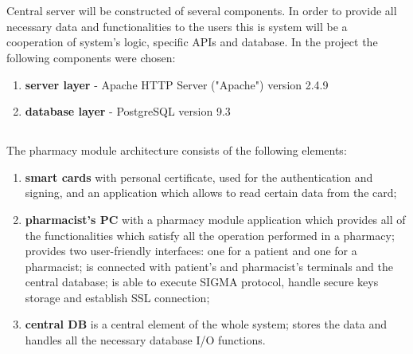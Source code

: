 \section{}

\subsection{}

Central server will be constructed of several components. In order to provide all necessary data and functionalities to the users this is system will be a cooperation of system's logic, specific APIs and database. In the project the following components were chosen:
\begin{enumerate}
\item \textbf{server layer} - Apache HTTP Server ("Apache") version 2.4.9
\item \textbf{database layer} - PostgreSQL version 9.3
\end{enumerate}

\subsection{}

The pharmacy module architecture consists of the following elements:
\begin{enumerate}
\item \textbf{smart cards} with personal certificate, used for the authentication and signing, and an application which allows to read certain data from the card;
\item \textbf{pharmacist's PC} with a pharmacy module application which provides all of the functionalities which satisfy all the operation performed in a pharmacy; provides two user-friendly interfaces: one for a patient and one for a pharmacist; is connected with patient’s and pharmacist’s terminals and the central database; is able to execute SIGMA protocol, handle secure keys storage and establish SSL connection;
\item{\textbf{central DB}} is a central element of the whole system; stores the data and handles all the necessary database I/O functions.
\end{enumerate}

\section{}

